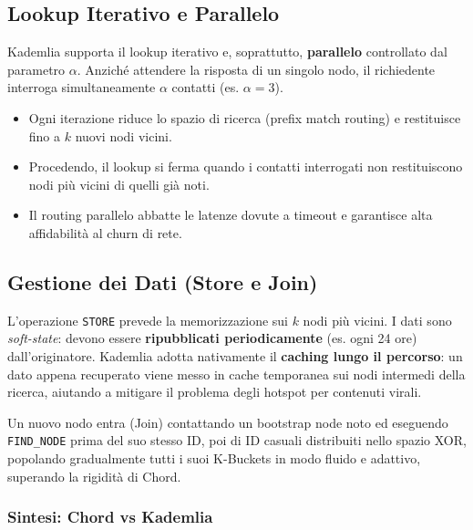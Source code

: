 \documentclass[
  italian,
  openany]{book}
\providecommand{\tightlist}{%
  \setlength{\itemsep}{0pt}\setlength{\parskip}{0pt}}
\begin{document}
\subsection{Lookup Iterativo e
Parallelo}\label{lookup-iterativo-e-parallelo}

Kademlia supporta il lookup iterativo e, soprattutto, \textbf{parallelo}
controllato dal parametro \(\alpha\). Anziché attendere la risposta di
un singolo nodo, il richiedente interroga simultaneamente \(\alpha\)
contatti (es. \(\alpha=3\)).

\begin{itemize}
\tightlist
\item
  Ogni iterazione riduce lo spazio di ricerca (prefix match routing) e
  restituisce fino a \(k\) nuovi nodi vicini.
\item
  Procedendo, il lookup si ferma quando i contatti interrogati non
  restituiscono nodi più vicini di quelli già noti.
\item
  Il routing parallelo abbatte le latenze dovute a timeout e garantisce
  alta affidabilità al churn di rete.
\end{itemize}

\subsection{Gestione dei Dati (Store e
Join)}\label{gestione-dei-dati-store-e-join}

L'operazione \texttt{STORE} prevede la memorizzazione sui \(k\) nodi più
vicini. I dati sono \emph{soft-state}: devono essere
\textbf{ripubblicati periodicamente} (es. ogni 24 ore) dall'originatore.
Kademlia adotta nativamente il \textbf{caching lungo il percorso}: un
dato appena recuperato viene messo in cache temporanea sui nodi
intermedi della ricerca, aiutando a mitigare il problema degli hotspot
per contenuti virali.

Un nuovo nodo entra (Join) contattando un bootstrap node noto ed
eseguendo \texttt{FIND\_NODE} prima del suo stesso ID, poi di ID casuali
distribuiti nello spazio XOR, popolando gradualmente tutti i suoi
K-Buckets in modo fluido e adattivo, superando la rigidità di Chord.

\subsubsection{Sintesi: Chord vs
Kademlia}\label{sintesi-chord-vs-kademlia}
\end{document}
